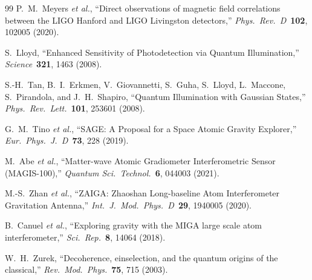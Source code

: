 \documentclass[12pt,a4paper]{article}
\theoremstyle{remark}
\begin{document}
\begin{thebibliography}{99}
P.~M.~Meyers \textit{et al.}, ``Direct observations of magnetic field
correlations between the LIGO Hanford and LIGO Livingston detectors,''
\textit{Phys.\ Rev.\ D}\ \textbf{102}, 102005 (2020).

S.~Lloyd, ``Enhanced Sensitivity of Photodetection via Quantum Illumination,''
\textit{Science}\ \textbf{321}, 1463 (2008).

S.-H.~Tan, B.~I.~Erkmen, V.~Giovannetti, S.~Guha, S.~Lloyd, L.~Maccone,
S.~Pirandola, and J.~H.~Shapiro, ``Quantum Illumination with Gaussian States,''
\textit{Phys.\ Rev.\ Lett.}\ \textbf{101}, 253601 (2008).

G.~M.~Tino \textit{et al.}, ``SAGE: A Proposal for a Space Atomic Gravity
Explorer,'' \textit{Eur.\ Phys.\ J.\ D}\ \textbf{73}, 228 (2019).

M.~Abe \textit{et al.}, ``Matter-wave Atomic Gradiometer Interferometric
Sensor (MAGIS-100),'' \textit{Quantum Sci.\ Technol.}\ \textbf{6},
044003 (2021).

M.-S.~Zhan \textit{et al.}, ``ZAIGA: Zhaoshan Long-baseline Atom
Interferometer Gravitation Antenna,''
\textit{Int.\ J.\ Mod.\ Phys.\ D}\ \textbf{29}, 1940005 (2020).

B.~Canuel \textit{et al.}, ``Exploring gravity with the MIGA large scale
atom interferometer,'' \textit{Sci.\ Rep.}\ \textbf{8}, 14064 (2018).

W.~H.~Zurek, ``Decoherence, einselection, and the quantum origins of
the classical,'' \textit{Rev.\ Mod.\ Phys.}\ \textbf{75}, 715 (2003).

\end{thebibliography}
\end{document}
